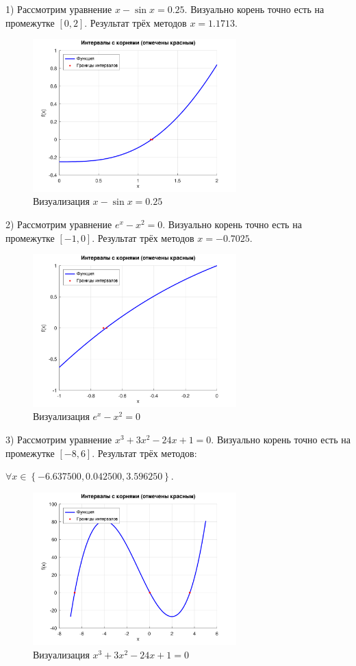 \documentclass[a4paper, 12pt]{article}
\begin{document}
    \newpage

    1) Рассмотрим уравнение $x - \sin{x} = 0.25$. Визуально корень точно есть на промежутке $\left[ 0, 2 \right]$. Результат трёх методов $x = 1.1713$.

    \begin{figure}[H]
        \centering
        \includegraphics[width=0.7\textwidth]{../reports/.png/xsinx.png}
        \caption{Визуализация $x - \sin{x} = 0.25$}
    \end{figure}

    2) Рассмотрим уравнение $e^x - x^2 = 0$. Визуально корень точно есть на промежутке $\left[-1, 0\right]$. Результат трёх методов $x = -0.7025$.

    \begin{figure}[H]
        \centering
        \includegraphics[width=0.7\textwidth]{../reports/.png/exx2.png}
        \caption{Визуализация $e^x - x^2 = 0$}
    \end{figure}

    3) Рассмотрим уравнение $x^3 + 3x^2 - 24x + 1 = 0$. Визуально корень точно есть на промежутке $\left[-8, 6\right]$. Результат трёх методов: 
    
    \centering $\forall x \in \left\{ -6.637500, 0.042500, 3.596250 \right\}$.

    \begin{figure}[H]
        \centering
        \includegraphics[width=0.7\textwidth]{../reports/.png/x3.png}
        \caption{Визуализация $x^3 + 3x^2 - 24x + 1 = 0$}
    \end{figure}

    
\end{document}

